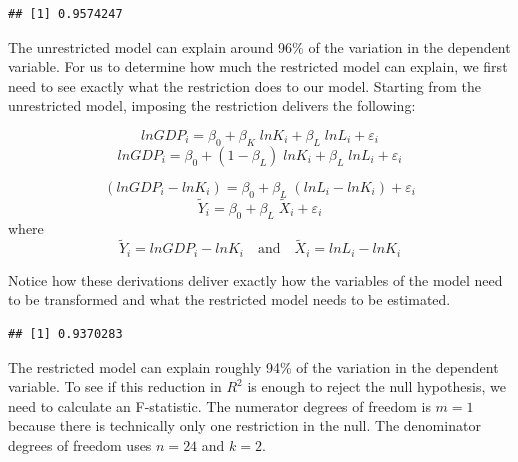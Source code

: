 \documentclass[
]{book}
\newenvironment{Shaded}{\begin{snugshade}}{\end{snugshade}}
\newcommand{\FunctionTok}[1]{\textcolor[rgb]{0.00,0.00,0.00}{#1}}
\newcommand{\NormalTok}[1]{#1}
\newcommand{\OtherTok}[1]{\textcolor[rgb]{0.56,0.35,0.01}{#1}}
\newcommand{\SpecialCharTok}[1]{\textcolor[rgb]{0.00,0.00,0.00}{#1}}
\begin{document}
\begin{verbatim}
## [1] 0.9574247
\end{verbatim}

The unrestricted model can explain around 96\% of the variation in the dependent variable. For us to determine how much the restricted model can explain, we first need to see exactly what the restriction does to our model. Starting from the unrestricted model, imposing the restriction delivers the following:

\[lnGDP_i = \beta_0 + \beta_K \; lnK_i + \beta_L \; lnL_i + \varepsilon_i\]
\[lnGDP_i = \beta_0 + (1 - \beta_L) \; lnK_i + \beta_L \; lnL_i + \varepsilon_i\]

\[(lnGDP_i - lnK_i) = \beta_0 + \beta_L \; (lnL_i - lnK_i) + \varepsilon_i\]
\[\tilde{Y}_i = \beta_0 + \beta_L \; \tilde{X}_i + \varepsilon_i\]
where
\[\tilde{Y}_i=lnGDP_i - lnK_i \quad \text{and} \quad \tilde{X}_i=lnL_i - lnK_i\]

Notice how these derivations deliver exactly how the variables of the model need to be transformed and what the restricted model needs to be estimated.

\begin{Shaded}
\end{Shaded}

\begin{verbatim}
## [1] 0.9370283
\end{verbatim}

The restricted model can explain roughly 94\% of the variation in the dependent variable. To see if this reduction in \(R^2\) is enough to reject the null hypothesis, we need to calculate an F-statistic. The numerator degrees of freedom is \(m=1\) because there is technically only one restriction in the null. The denominator degrees of freedom uses \(n=24\) and \(k=2\).
\end{document}
